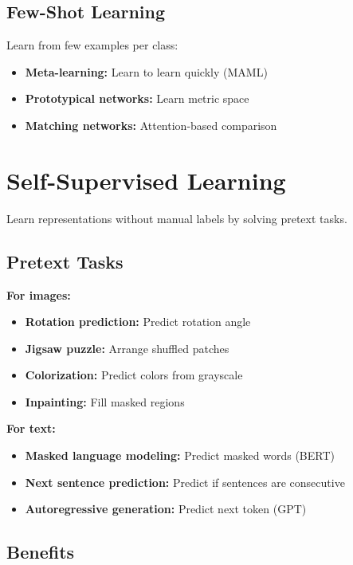 \subsection{Few-Shot Learning}

Learn from few examples per class:
\begin{itemize}
    \item \textbf{Meta-learning:} Learn to learn quickly (MAML)
    \item \textbf{Prototypical networks:} Learn metric space
    \item \textbf{Matching networks:} Attention-based comparison
\end{itemize}

\section{Self-Supervised Learning}
\label{sec:self-supervised}

Learn representations without manual labels by solving pretext tasks.

\subsection{Pretext Tasks}

\textbf{For images:}
\begin{itemize}
    \item \textbf{Rotation prediction:} Predict rotation angle
    \item \textbf{Jigsaw puzzle:} Arrange shuffled patches
    \item \textbf{Colorization:} Predict colors from grayscale
    \item \textbf{Inpainting:} Fill masked regions
\end{itemize}

\textbf{For text:}
\begin{itemize}
    \item \textbf{Masked language modeling:} Predict masked words (BERT)
    \item \textbf{Next sentence prediction:} Predict if sentences are consecutive
    \item \textbf{Autoregressive generation:} Predict next token (GPT)
\end{itemize}

\subsection{Benefits}

